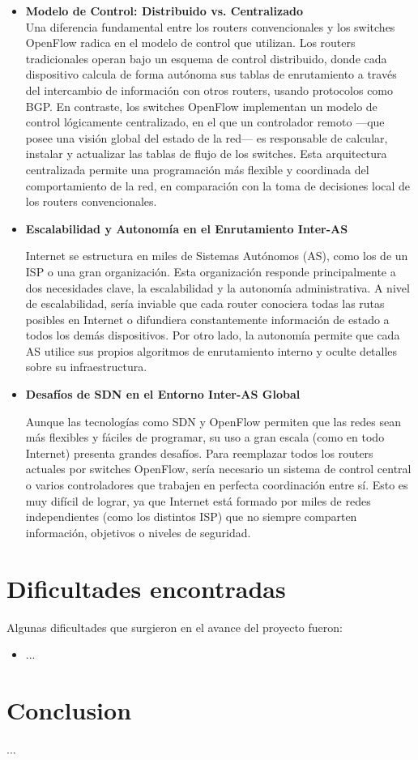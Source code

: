 \documentclass[titlepage,a4paper]{article}
\begin{document}
    \begin{itemize}
        \item \textbf{Modelo de Control: Distribuido vs. Centralizado}
        \\ Una diferencia fundamental entre los routers convencionales y los switches OpenFlow radica en el modelo de control que utilizan. Los routers tradicionales operan bajo un esquema de control distribuido, donde cada dispositivo calcula de forma autónoma sus tablas de enrutamiento a través del intercambio de información con otros routers, usando protocolos como BGP. En contraste, los switches OpenFlow implementan un modelo de control lógicamente centralizado, en el que un controlador remoto —que posee una visión global del estado de la red— es responsable de calcular, instalar y actualizar las tablas de flujo de los switches. Esta arquitectura centralizada permite una programación más flexible y coordinada del comportamiento de la red, en comparación con la toma de decisiones local de los routers convencionales. \\
        
        \item \textbf{Escalabilidad y Autonomía en el Enrutamiento Inter-AS}

        Internet se estructura en miles de Sistemas Autónomos (AS), como los de un ISP o una gran organización. Esta organización responde principalmente a dos necesidades clave, la escalabilidad y la autonomía administrativa. A nivel de escalabilidad, sería inviable que cada router conociera todas las rutas posibles en Internet o difundiera constantemente información de estado a todos los demás dispositivos. Por otro lado, la autonomía permite que cada AS utilice sus propios algoritmos de enrutamiento interno y oculte detalles sobre su infraestructura.

        \item \textbf{Desafíos de SDN en el Entorno Inter-AS Global}

        Aunque las tecnologías como SDN y OpenFlow permiten que las redes sean más flexibles y fáciles de programar, su uso a gran escala (como en todo Internet) presenta grandes desafíos. Para reemplazar todos los routers actuales por switches OpenFlow, sería necesario un sistema de control central o varios controladores que trabajen en perfecta coordinación entre sí. Esto es muy difícil de lograr, ya que Internet está formado por miles de redes independientes (como los distintos ISP) que no siempre comparten información, objetivos o niveles de seguridad.
        
        
    \end{itemize}
    
    \section{Dificultades encontradas}\label{sec:dificultadesEncontras}
    Algunas dificultades que surgieron en el avance del proyecto fueron:
    
    \begin{itemize}
        \item ...
    \end{itemize}
    
\section{Conclusion}\label{conclusion}
    ...
    
\end{document}
